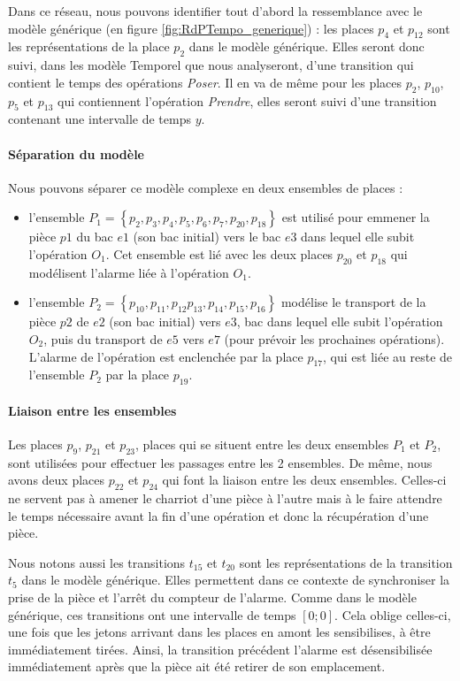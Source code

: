 Dans ce réseau, nous pouvons identifier tout d'abord la ressemblance avec le modèle générique (en figure \ref{fig:RdPTempo_generique}) : les places $p_4$ et $p_{12}$ sont les représentations de la place $p_2$ dans le modèle générique. Elles seront donc suivi, dans les modèle Temporel que nous analyseront, d'une transition qui contient le temps des opérations \emph{Poser}. Il en va de même pour les places $p_2$, $p_{10}$, $p_{5}$ et $p_{13}$ qui contiennent l'opération \emph{Prendre}, elles seront suivi d'une transition contenant une intervalle de temps $y$.

\paragraph*{Séparation du modèle}
Nous pouvons séparer ce modèle complexe en deux ensembles de places : \begin{itemize}
\item l'ensemble $P_1 =\left\lbrace p_2,p_3,p_4,p_5,p_6,p_7,p_{20},p_{18}\right\rbrace$ est utilisé pour emmener la pièce $p1$ du bac $e1$ (son bac initial) vers le bac $e3$ dans lequel elle subit l'opération $O_1$. Cet ensemble est lié avec les deux places $p_{20}$ et $p_{18}$ qui modélisent l'alarme liée à l'opération $O_1$.
\item  l'ensemble $P_2 =\left\lbrace p_{10}, p_{11}, p_{12} p_{13}, p_{14}, p_{15}, p_{16}\right\rbrace$ modélise le transport de la pièce $p2$ de $e2$ (son bac initial) vers $e3$, bac dans lequel elle subit l'opération $O_2$, puis du transport de $e5$ vers $e7$ (pour prévoir les prochaines opérations). L'alarme de l'opération est enclenchée par la place $p_{17}$, qui est liée au reste de l'ensemble $P_2$ par la place $p_{19}$.
\end{itemize}
	
\paragraph*{Liaison entre les ensembles}
Les places $p_9$, $p_{21}$ et $p_{23}$, places qui se situent entre les deux ensembles $P_1$ et $P_2$, sont utilisées pour effectuer les passages entre les 2 ensembles. De même, nous avons deux places $p_{22}$ et $p_{24}$ qui font la liaison entre les deux ensembles. Celles-ci ne servent pas à amener le charriot d'une pièce à l'autre mais à le faire attendre le temps nécessaire avant la fin d'une opération et donc la récupération d'une pièce.


Nous notons aussi les transitions $t_{15}$ et $t_{20}$ sont les représentations de la transition $t_5$ dans le modèle générique. Elles permettent dans ce contexte de synchroniser la prise de la pièce et l'arrêt du compteur de l'alarme. Comme dans le modèle générique, ces transitions ont une intervalle de temps $[0;0]$. Cela oblige celles-ci, une fois que les jetons arrivant dans les places en amont les sensibilises, à être immédiatement tirées. Ainsi, la transition précédent l'alarme est désensibilisée immédiatement après que la pièce ait été retirer de son emplacement.
